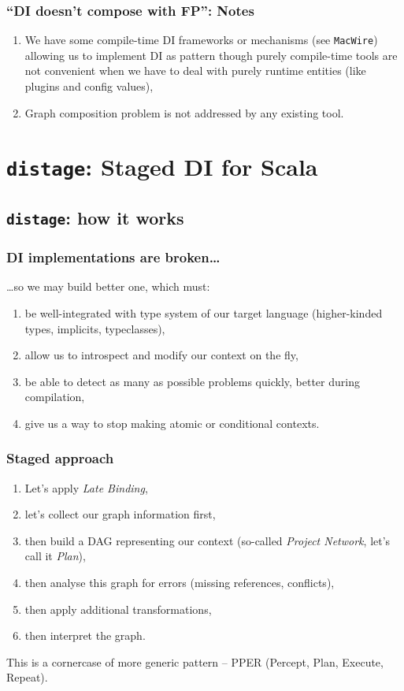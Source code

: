 \documentclass[usenames,dvipsnames]{beamer}
\newcommand{\distage}{\texttt{distage}\xspace}
\begin{document}
\begin{frame}
\frametitle{``DI doesn't compose with FP'': Notes}
\begin{enumerate}
\item We have some compile-time DI frameworks or mechanisms (see \texttt{MacWire}) allowing us to implement DI as pattern 
      though purely compile-time tools are not convenient when we have to deal with purely runtime entities 
      (like plugins and config values),
\item Graph composition problem is not addressed by any existing tool.
\end{enumerate}
\end{frame}

\section{\distage: Staged DI for Scala}
\subsection{\distage: how it works}

\begin{frame}
\frametitle{DI implementations are broken\dots}
\dots so we may build better one, which must:
\begin{enumerate}
\item be well-integrated with type system of our target language (higher-kinded types, implicits, typeclasses),
\item allow us to introspect and modify our context on the fly,
\item be able to detect as many as possible problems quickly, better during compilation,
\item give us a way to stop making atomic or conditional contexts.
\end{enumerate}
\end{frame}

\begin{frame}
\frametitle{Staged approach}
\begin{enumerate}
\item Let's apply \textit{Late Binding},
\item let's collect our graph information first,
\item then build a DAG representing our context (so-called \textit{Project Network}, let's call it \textit{Plan}),
\item then analyse this graph for errors (missing references, conflicts),
\item then apply additional transformations,
\item then interpret the graph.
\end{enumerate}
This is a cornercase of more generic pattern -- PPER (Percept, Plan, Execute, Repeat).
\end{frame}
\end{document}
